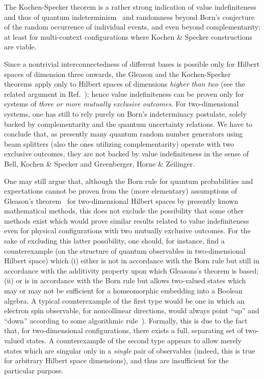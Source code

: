 \documentclass[10pt]{article}%
\begin{document}
The Kochen-Specker theorem is a rather strong indication of value indefiniteness
and thus  of quantum indeterminism~\cite{2008-cal-svo} and randomness beyond Born's conjecture of the random occurrence of
individual events, and even beyond complementarity; at least for multi-context configurations where Kochen \& Specker constructions are viable.

Since a nontrivial interconnectedness of different bases
is possible only for Hilbert spaces of dimension three onwards,
the Gleason and the Kochen-Specker theorems apply only to Hilbert spaces
of dimensions {\em higher than two} (see the related argument in Ref.~\cite[p.~193]{peres}); hence value indefiniteness can be proven
only for systems of {\em three or more mutually exclusive outcomes}.
For two-dimensional systems, one has still to rely purely on Born's indeterminacy postulate,
solely backed by complementarity and the quantum uncertainty relations.
We have to conclude that,
as presently many  quantum random number generators using beam splitters (also the ones utilizing complementarity)
operate with two exclusive outcomes,
they are not backed by value indefiniteness in the sense of Bell, Kochen \& Specker and Greenberger, Horne \& Zeilinger.

One may still argue that, although the Born rule for quantum probabilities and expectations
cannot be proven from the (more elementary) assumptions of Gleason's theorem~\cite[\S~7.2]{peres}
for two-dimensional Hilbert spaces by presently known mathematical methods, this
does not exclude the possibility that some other methods exist which would  prove similar results
related to value indefiniteness even for physical configurations with two
mutually exclusive outcomes.
For the sake of excluding this latter possibility, one should,
for instance, find a counterexample
(on the structure of quantum observables in two-dimensional Hilbert space)
which
(i) either is not in accordance with the Born rule but still
in accordance with the additivity property upon which Gleasons's theorem is based;
(ii) or is in accordance with the Born rule but allows
two-valued states which may or may not be sufficient for a homeomorphic embedding into a Boolean algebra.
A typical counterexample of the first type
would be one in which an electron spin observable,
for noncollinear directions, would always point ``up'' and ``down'' according to some algorithmic
rule~\cite[pp.~70-72]{svozil-ql}).
Formally, this is due to the fact that, for two-dimensional configurations, there exists a
full, separating set of two-valued states.
A counterexample of the second type appears to allow merely states which
are singular only in a {\em single} pair of observables (indeed, this is true for arbitrary Hilbert space dimensions), and thus are insufficient for the particular purpose.
\end{document}
